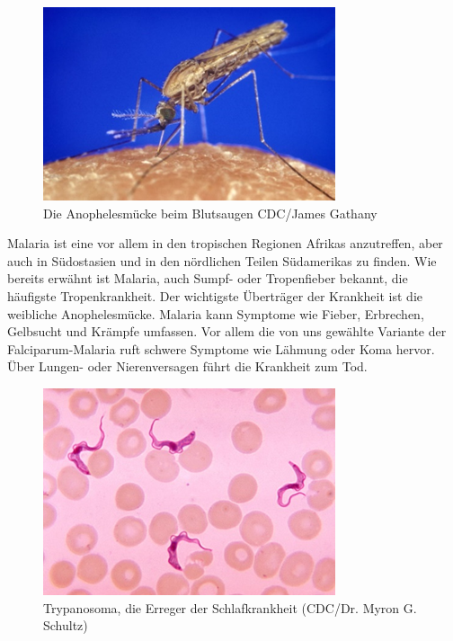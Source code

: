 \documentclass[11pt]{article}
\begin{document}
    \begin{figure}
        \includegraphics[width=\linewidth]{Anophelesmucke}
        \caption{Die Anophelesmücke beim Blutsaugen CDC/James Gathany}
    \end{figure}

    Malaria ist eine vor allem in den tropischen Regionen Afrikas anzutreffen, aber auch in Südostasien und in den nördlichen Teilen Südamerikas zu finden. Wie bereits erwähnt ist Malaria, auch Sumpf- oder Tropenfieber bekannt, die häufigste Tropenkrankheit. Der wichtigste Überträger der Krankheit ist die weibliche Anophelesmücke. Malaria kann Symptome wie Fieber, Erbrechen, Gelbsucht und Krämpfe umfassen. Vor allem die von uns gewählte Variante der Falciparum-Malaria ruft schwere Symptome wie Lähmung oder Koma hervor. Über Lungen- oder Nierenversagen führt die Krankheit zum Tod.

    \begin{figure}
        \includegraphics[width=\linewidth]{Trypanosoma}
        \caption{Trypanosoma, die Erreger der Schlafkrankheit (CDC/Dr. Myron G. Schultz)}
    \end{figure}
\end{document}
